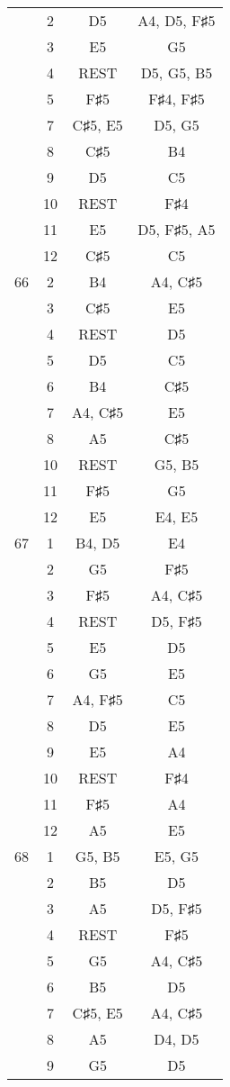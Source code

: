 \documentclass{article}
\begin{document}
\begin{longtable}{|c|c|c|c|}
  & 2 & D5 & A4, D5, F♯5 \\ 
  & 3 & E5 & G5 \\ 
  & 4 & REST & D5, G5, B5 \\ 
  & 5 & F♯5 & F♯4, F♯5 \\ 
  & 7 & C♯5, E5 & D5, G5 \\ 
  & 8 & C♯5 & B4 \\ 
  & 9 & D5 & C5 \\ 
  & 10 & REST & F♯4 \\ 
  & 11 & E5 & D5, F♯5, A5 \\ 
  & 12 & C♯5 & C5 \\ 
\hline
66 & 2 & B4 & A4, C♯5 \\ 
  & 3 & C♯5 & E5 \\ 
  & 4 & REST & D5 \\ 
  & 5 & D5 & C5 \\ 
  & 6 & B4 & C♯5 \\ 
  & 7 & A4, C♯5 & E5 \\ 
  & 8 & A5 & C♯5 \\ 
  & 10 & REST & G5, B5 \\ 
  & 11 & F♯5 & G5 \\ 
  & 12 & E5 & E4, E5 \\ 
\hline
67 & 1 & B4, D5 & E4 \\ 
  & 2 & G5 & F♯5 \\ 
  & 3 & F♯5 & A4, C♯5 \\ 
  & 4 & REST & D5, F♯5 \\ 
  & 5 & E5 & D5 \\ 
  & 6 & G5 & E5 \\ 
  & 7 & A4, F♯5 & C5 \\ 
  & 8 & D5 & E5 \\ 
  & 9 & E5 & A4 \\ 
  & 10 & REST & F♯4 \\ 
  & 11 & F♯5 & A4 \\ 
  & 12 & A5 & E5 \\ 
\hline
68 & 1 & G5, B5 & E5, G5 \\ 
  & 2 & B5 & D5 \\ 
  & 3 & A5 & D5, F♯5 \\ 
  & 4 & REST & F♯5 \\ 
  & 5 & G5 & A4, C♯5 \\ 
  & 6 & B5 & D5 \\ 
  & 7 & C♯5, E5 & A4, C♯5 \\ 
  & 8 & A5 & D4, D5 \\ 
  & 9 & G5 & D5 \\ 

\end{longtable}
\end{document}
